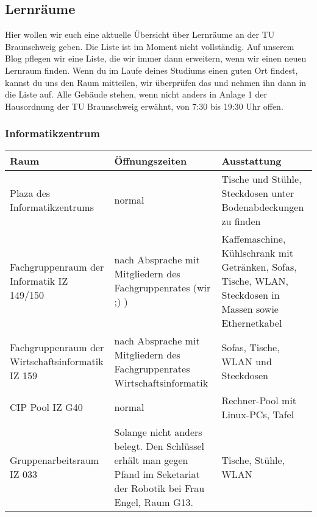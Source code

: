 
\subsection{Lernräume}

Hier wollen wir euch eine aktuelle Übersicht über Lernräume an der TU Braunschweig geben. Die Liste ist im Moment nicht vollständig. Auf unserem Blog pflegen wir eine Liste, die wir immer dann erweitern, wenn wir einen neuen Lernraum finden. Wenn du im Laufe deines Studiums einen guten Ort findest, kannst du uns den Raum mitteilen, wir überprüfen das und nehmen ihn dann in die Liste auf. Alle Gebäude stehen, wenn nicht anders in Anlage 1 der Hausordnung der TU Braunschweig erwähnt, von 7:30 bis 19:30 Uhr offen.

\subsubsection*{Informatikzentrum}

\begin{tabular}{|p{4cm}|p{5cm}|p{8cm}|}
	\hline Raum & Öffnungszeiten & Ausstattung \\ 
	
	\hline Plaza des Informatikzentrums & normal &  Tische und Stühle, Steckdosen unter Bodenabdeckungen zu finden \\
	
	\hline Fachgruppenraum der Informatik IZ 149/150 &
	nach Absprache mit Mitgliedern des
	Fachgruppenrates (wir ;) ) & Kaffemaschine,
	Kühlschrank mit Getränken, 
	Sofas, Tische, WLAN, Steckdosen in Massen sowie Ethernetkabel\\ 

	\hline Fachgruppenraum der Wirtschaftsinformatik
	IZ 159 & nach Absprache mit Mitgliedern des
	Fachgruppenrates Wirtschaftsinformatik & Sofas, Tische, WLAN und Steckdosen \\ 

	\hline CIP Pool IZ G40 & normal & Rechner-Pool mit Linux-PCs, Tafel\\ 

	\hline Gruppenarbeitsraum IZ 033 & Solange nicht anders belegt. Den Schlüssel
	erhält man gegen Pfand im Seketariat der Robotik bei Frau Engel,
	Raum G13.
	 &
	Tische, Stühle, WLAN
	\\
	\hline
\end{tabular}

